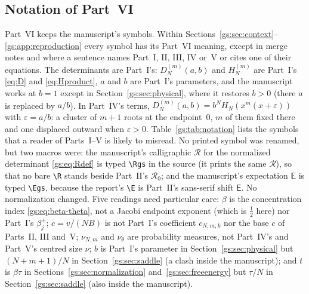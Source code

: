 \documentclass[11pt,a4paper]{article}
\numberwithin{equation}{section}
\theoremstyle{definition}
\theoremstyle{remark}
\newcommand{\E}{\mathsf E}
\newcommand{\Rzero}{\mathcal R_0}
\newcommand{\Rgs}{\mathcal R}
\newcommand{\Egs}{\mathbb E}
\begin{document}
\subsection{Notation of Part~VI}\label{gs:sec:notation}
Part~VI keeps the manuscript's symbols.  Within
Sections~\ref{gs:sec:context}--\ref{gs:app:reproduction} every symbol has its
Part~VI meaning, except in merge notes and where a sentence names Part~I,
II, III, IV or~V or cites one of their equations.  The determinants are
Part~I's: $D_N^{(m)}(a,b)$ and $H_N^{(m)}$ are Part~I's \eqref{eq:D} and
\eqref{eq:Hproduct}, $a$ and $b$ are Part~I's parameters, and the
manuscript works at $b=1$ except in Section~\ref{gs:sec:physical}, where it
restores $b>0$ (there $a$ is replaced by $a/b$).  In Part~IV's terms,
$D_N^{(m)}(a,b)=b^NH_N(x^m(x+\varepsilon))$ with $\varepsilon=a/b$: a cluster
of $m+1$ roots at the endpoint~$0$, $m$ of them fixed there and one
displaced outward when $\varepsilon>0$.  Table~\ref{gs:tab:notation} lists
the symbols that a reader of Parts~I--V is likely to misread.  No printed
symbol was renamed, but two macros were: the manuscript's calligraphic
$\mathcal R$ for the normalized determinant \eqref{gs:eq:Rdef} is typed
\verb|\Rgs| in the source (it prints the same $\Rgs$), so that no bare
\verb|\R| stands beside Part~II's $\Rzero$; and the manuscript's expectation
$\mathbb E$ is typed \verb|\Egs|,
because the report's \verb|\E| is Part~II's sans-serif shift $\E$.  No
normalization changed.  Five readings need particular care: $\beta$ is the
concentration index \eqref{gs:eq:beta-theta}, not a Jacobi endpoint
exponent (which is $\frac12$ here) nor Part~I's $\beta_j^\pm$; $c=v/(NB)$ is
not Part~I's coefficient $c_{N,m,k}$ nor the base $c$ of Parts~II, III
and~V; $\nu_{N,m}$ and $\nu_\theta$ are probability measures, not Part~IV's
and Part~V's centred size $\nu$; $b$ is Part~I's parameter in
Section~\ref{gs:sec:physical} but $(N+m+1)/N$ in
Section~\ref{gs:sec:saddle} (a clash inside the manuscript); and $t$ is
$\beta\tau$ in Sections~\ref{gs:sec:normalization}
and~\ref{gs:sec:freeenergy} but $\tau/N$ in Section~\ref{gs:sec:saddle}
(also inside the manuscript).
\end{document}
